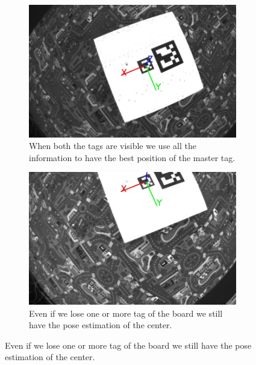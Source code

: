 \begin{figure}[!htbp]
   \begin{subfigure}[b]{0.45\textwidth}
        \includegraphics[width=\textwidth]{img/frame2.jpg}
        \caption{When both the tags are visible we use all the information to have the best position of the master tag.}
        \label{fig:three}
   \end{subfigure}\hfill
    \begin{subfigure}[b]{0.45\textwidth}
        \includegraphics[width=\textwidth]{img/frame3.jpg}
        \caption{Even if we lose one or more tag of the board we still have the pose estimation of the center.}
        \label{fig:four}
   \end{subfigure}
   

\end{figure}
